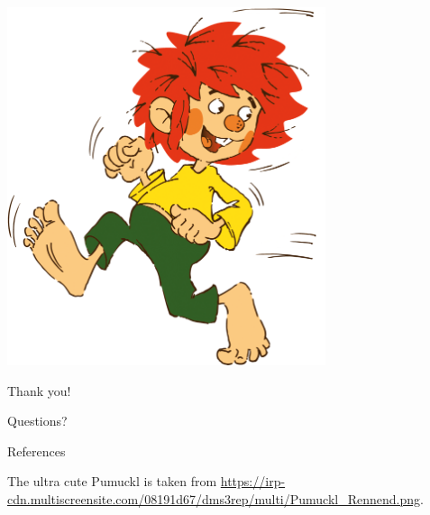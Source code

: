 \documentclass[10pt, aspectratio=169]{beamer}
\begin{document}
\begin{frame}[standout]
  \begin{minipage}{0.45\textwidth}
    \centering
    \includegraphics[width=0.7\textwidth]{figs/pumuckl.png}
  \end{minipage}
  \hfill
  \begin{minipage}{0.50\textwidth}
      \centering
      Thank you! \par Questions?
  \end{minipage}
\end{frame}

\appendix

\begin{frame}[allowframebreaks]{References}
  \small
  
  The ultra cute Pumuckl is taken from 
  \url{https://irp-cdn.multiscreensite.com/08191d67/dms3rep/multi/Pumuckl_Rennend.png}.
\end{frame}
\end{document}
